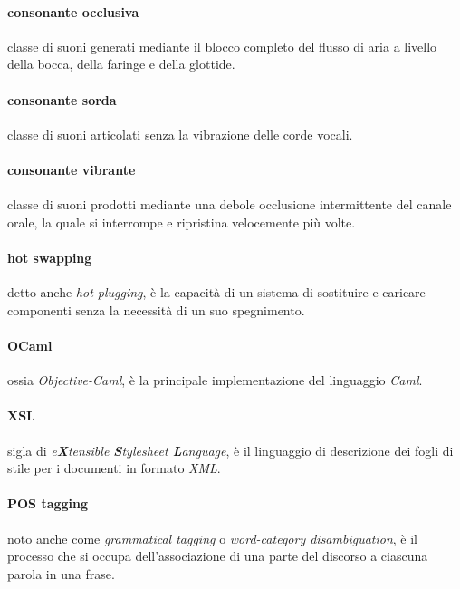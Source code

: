 \paragraph{consonante occlusiva}
\label{glo:consoccl}
  classe di suoni generati mediante il blocco completo del flusso di aria a livello della bocca,
  della faringe e della glottide.
\paragraph{consonante sorda}
\label{glo:conssord}
  classe di suoni articolati senza la vibrazione delle corde vocali.

\paragraph{consonante vibrante}
\label{glo:consvibr}
  classe di suoni prodotti mediante una debole occlusione intermittente del canale orale, la quale
  si interrompe e ripristina velocemente più volte.

\paragraph{hot swapping} 
\label{glo:hots}
 detto anche \textit{hot plugging}, è la capacità di un sistema di sostituire e caricare componenti
 senza la necessità di un suo spegnimento.

\paragraph{OCaml}
\label{glo:ocam}
  ossia \textit{Objective-Caml}, è la principale implementazione del linguaggio \textit{Caml}.

\paragraph{XSL}
\label{glo:xsl}
  sigla di \textit{e\textbf{X}tensible \textbf{S}tylesheet \textbf{L}anguage}, è il linguaggio di descrizione
  dei fogli di stile per i documenti in formato \textit{XML}.


\paragraph{POS tagging}
\label{glo:postag}
  noto anche come \textit{grammatical tagging} o \textit{word-category disambiguation}, è il processo che si occupa
  dell'associazione di una parte del discorso a ciascuna parola in una frase.

